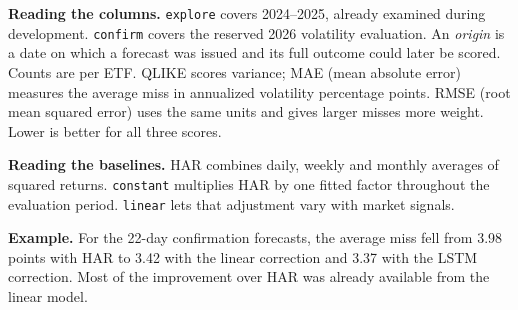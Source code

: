 \documentclass[11pt]{article}
\begin{document}
\begin{table}[htbp]
\begin{tabular}{lrrrrrr}
\hline
\end{tabular}\par\vspace{6pt}\begin{minipage}{.97\linewidth}\small\setlength{\parskip}{4pt}
\textbf{Reading the columns.} \texttt{explore} covers 2024--2025, already examined during development. \texttt{confirm} covers the reserved 2026 volatility evaluation. An \emph{origin} is a date on which a forecast was issued and its full outcome could later be scored. Counts are per ETF. QLIKE scores variance; MAE (mean absolute error) measures the average miss in annualized volatility percentage points. RMSE (root mean squared error) uses the same units and gives larger misses more weight. Lower is better for all three scores.

\textbf{Reading the baselines.} HAR combines daily, weekly and monthly averages of squared returns. \texttt{constant} multiplies HAR by one fitted factor throughout the evaluation period. \texttt{linear} lets that adjustment vary with market signals.

\textbf{Example.} For the 22-day confirmation forecasts, the average miss fell from 3.98 points with HAR to 3.42 with the linear correction and 3.37 with the LSTM correction. Most of the improvement over HAR was already available from the linear model.
\end{minipage}\end{table}
\end{document}
